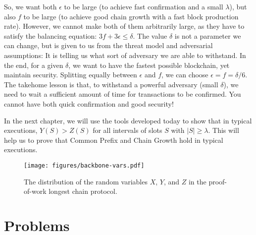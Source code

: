 So, we want both  $\epsilon$ to be large (to achieve fast confirmation and a small $\lambda$), but also $f$ to be large (to achieve good chain growth with a fast block production rate). However, we cannot make both of them arbitrarily large, as they have to satisfy the balancing equation: $3f + 3\epsilon \leq \delta$. The value $\delta$ is not a parameter we can change, but is given to us from the threat model and adversarial assumptions: It is telling us what sort of adversary we are able to withstand. In the end, for a given $\delta$, we want to have the fastest possible blockchain, yet maintain security. Splitting equally between $\epsilon$ and $f$, we can choose $\epsilon = f = \delta/6$. The takehome lesson is that, to withstand a powerful adversary (small $\delta$), we need to wait a sufficient amount of time for transactions to be confirmed. You cannot have both quick confirmation and good security!

In the next chapter, we will use the tools developed today to show that in typical executions, $Y(S) > Z(S)$ for all intervals of slots $S$ with $|S|\geq \lambda$. This will help us to prove that Common Prefix and Chain Growth hold in typical executions.

\begin{landscape}\centering
\begin{figure*}
    \centering
    \vspace*{\fill}
    \texttt{[image: figures/backbone-vars.pdf]}
    \caption{The distribution of the random variables $X$, $Y$, and $Z$ in the proof-of-work longest chain protocol.}
    \label{fig.balancing_eq}
    \vspace*{\fill}
\end{figure*}
\end{landscape}

\section*{Problems}

